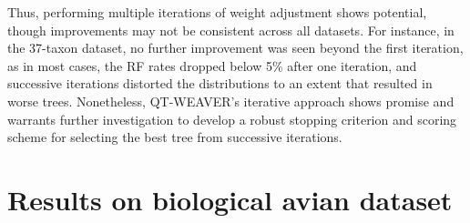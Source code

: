 \documentclass[10pt,a4paper]{article}
\begin{document}
Thus, performing multiple iterations of weight adjustment shows potential, though improvements may not be consistent across all datasets. For instance, in the 37-taxon dataset, no further improvement was seen beyond the first iteration, as in most cases, the RF rates dropped below 5\% after one iteration, and successive iterations distorted the distributions to an extent that resulted in worse trees. Nonetheless, QT-WEAVER’s iterative approach shows promise and warrants further investigation to develop a robust stopping criterion and scoring scheme for selecting the best tree from successive iterations.





\vspace{-10pt}
\section{Results on biological avian dataset}
\end{document}
